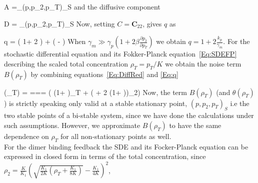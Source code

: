 \documentclass[notitlepage,dvips,rmp,fleqn,superscriptaddress,floatfix]{revtex4-1}
\newcounter{Sequ}
\newenvironment{SEqn}
  {\stepcounter{Sequ}%
    \addtocounter{equation}{-1}%
    \renewcommand\theequation{S\arabic{Sequ}}\equation}
  {\endequation}
\begin{document}
%
\begin{SEqn}
A =_{(p,p_2,p_T)_S}
\label{Eq:JacobianRed}
\end{SEqn}
%
and the diffusive component
%
\begin{SEqn}
D = _{(p,p_2,p_T)_S}
\label{Eq:DiffRed}
\end{SEqn}
%
Now, setting $\displaystyle C = \textbf{C}_{22}$, gives $q$ as 
%
\begin{SEqn}
q = \left( 1+ 2  \right) 
+  
 \left( -  \right)
\label{Eq:q}
\end{SEqn}
%      
When $\gamma_m \gg \gamma_{p}(1 + 2 \beta\frac{\partial p_2}{\partial p_T} )$ we obtain $\displaystyle q = 1 + 2 \frac{k_p}{\gamma_m }$. For the stochastic differential equation and its Fokker-Planck equation~\ref{Eq:SDEFP} describing the scaled total concentration $\rho_T=p_T/K$ we obtain the noise term $B(\rho_T)$ by combining equations~\ref{Eq:DiffRed} and \ref{Eq:q}
%
\begin{SEqn}
\theta(\rho_T) = ===  \left( \left(1+ \right)\rho_T + \left( + 2 \beta\left(1+ \right)\right)\rho_2\right)
\label{Eq:Theta}
\end{SEqn}
%
Now, the term $B(\rho_T)$ (and $\theta(\rho_T)$) is strictly speaking only valid at a stable stationary point, $(p,p_2,p_T)_S$ i.e the two stable points of a bi-stable system, since we have done the calculations under such assumptions. However, we approximate $B(\rho_T)$ to have the same dependence on $\rho_T$ for all non-stationary points as well.\\
For the dimer binding feedback the SDE and its Focker-Planck equation can be expressed in closed form in terms of the total concentration, since $\rho_2= \frac{K}{K_1} \left( \sqrt{ \frac{K_1}{2 K} \left(\rho_T + \frac{K_1}{8 K}\right)} - \frac{K_1}{4 K}\right)^2$,
%
\end{document}
